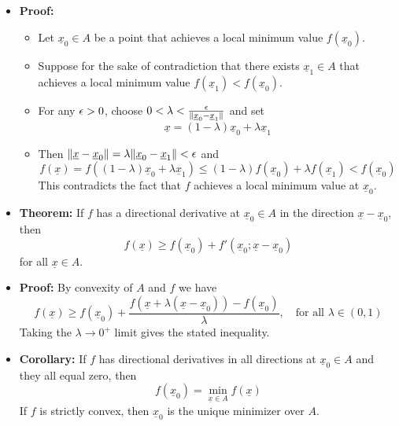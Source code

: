 \documentclass[11pt,twoside]{report}
\newcommand{\vecnot}{\underline}
\begin{document}
\begin{itemize}
\begin{enumerate}[(i)]
\item If $f$ is strictly convex on $A$ and achieves a local minimum value on $A$, then there is a unique point $\vecnot{x}_0 \in A$ that achieves the global minimum value on $A$.
\end{enumerate}


\item \textbf{Proof:} 
\begin{itemize}
\item Let $\vecnot{x}_0 \in A$ be a point that achieves a local minimum value $f(\vecnot{x}_0)$. 

\item Suppose for the sake of contradiction  that there exists $\vecnot{x}_1 \in A$ that  achieves a local minimum value $f(\vecnot{x}_1) < f(\vecnot{x}_0)$. 

\item For any $\epsilon > 0$, choose  $0 < \lambda < \frac{ \eps}{ \| \vecnot{x}_0 - \vecnot{x}_1\|}$ and set 
\[
 \vecnot{x}  = (1- \lambda)  \vecnot{x}_0   + \lambda  \vecnot{x}_1
\]

\item Then $\|  \vecnot{x} -  \vecnot{x}_0\| = \lambda  \| \vecnot{x}_0 - \vecnot{x}_1\|  < \eps$ and 
\[
f( \vecnot{x}) = f( (1- \lambda)  \vecnot{x}_0   + \lambda  \vecnot{x}_1)  \le (1- \lambda) f( \vecnot{x}_0 ) + \lambda  f(\vecnot{x}_1) <   f( \vecnot{x}_0 ) 
\]
This contradicts the fact that $f$ achieves  a local minimum value at $\vecnot{x}_0$.
\end{itemize}


\item \textbf{Theorem:} If $f$ has a directional derivative  at $\vecnot{x}_0 \in A$ in the direction $\vecnot{x}-\vecnot{x}_0$, then 
\[ 
f(\vecnot{x}) \geq f(\vecnot{x}_0) +  f' (\vecnot{x}_0;\vecnot{x}-\vecnot{x}_0) %
\]
for all $\vecnot{x}\in A$.

\item \textbf{Proof:}
By convexity of $A$ and $f$ we have 
\[
f(\vecnot{x}) \ge f(\vecnot{x}_0) +  \frac{ f(\vecnot{x} + \lambda( \vecnot{x} - \vecnot{x}_0)) - f(\vecnot{x}_0)}{\lambda}, \quad \text{for all $\lambda \in (0,1)$}
\]
Taking the $\lambda \to 0^+$ limit gives the stated inequality. 

 \item \textbf{Corollary:}  
If $f$ has directional derivatives in all directions at $\vecnot{x}_0 \in A$ and they all equal zero, then \vspace{-2mm}
\[ 
f(\vecnot{x}_0) = \min_{\vecnot{x}\in A} f(\vecnot{x})
\]
If $f$ is strictly convex, then $\vecnot{x}_0$ is the unique minimizer over $A$.




\end{itemize}
\end{document}
